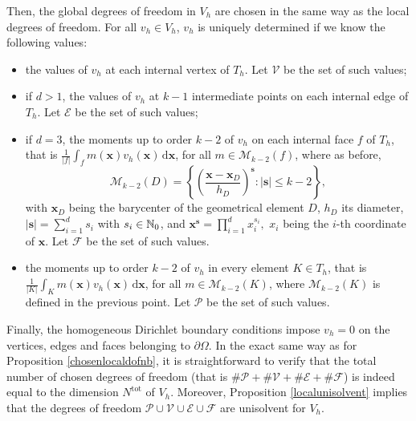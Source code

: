 Then, the global degrees of freedom in $V_h$ are chosen in the same way as the local degrees of freedom. For all $v_h\in V_h$, $v_h$ is uniquely determined if we know the following values:
\begin{itemize}
\item the values of $v_h$ at each internal vertex of $T_h$. Let $\mathcal{V}$ be the set of such values;
\item if $d>1$, the values of $v_h$ at $k-1$ intermediate points on each internal edge of $T_h$. Let $\mathcal{E}$ be the set of such values;
\item if $d=3$, the moments up to order $k-2$ of $v_h$ on each internal face $f$ of $T_h$, that is $\frac{1}{|f|}\int_{f}m(\mathbf{x})v_h(\mathbf{x})\, \mathrm{d}\mathbf{x}$, for all $m\in \mathcal{M}_{k-2}(f)$, where as before, $$\mathcal{M}_{k-2}(D) = \left\{\left(\frac{\mathbf{x}-\mathbf{x}_D}{h_D}\right)^\mathbf{s} : |\mathbf{s}|\leq k-2\right\},$$ with $\mathbf{x}_D$ being the barycenter of the geometrical element $D$, $h_D$ its diameter, $|\mathbf{s}| = \sum_{i=1}^d s_i$ with $s_i\in \mathbb{N}_0$, and $\mathbf{x}^\mathbf{s}=\prod_{i=1}^d x_i^{s_i},$ $x_i$ being the $i$-th coordinate of $\mathbf{x}$. Let $\mathcal{F}$ be the set of such values.
\item the moments up to order $k-2$ of $v_h$ in every element $K\in T_h$, that is $\frac{1}{|K|}\int_Km(\mathbf{x})v_h(\mathbf{x})\, \mathrm{d}\mathbf{x}$, for all $m\in \mathcal{M}_{k-2}(K)$, where $\mathcal{M}_{k-2}(K)$ is defined in the previous point. Let $\mathcal{P}$ be the set of such values.
\end{itemize}
Finally, the homogeneous Dirichlet boundary conditions impose $v_h=0$ on the vertices, edges and faces belonging to $\partial \Omega$. In the exact same way as for Proposition \ref{chosenlocaldofnb}, it is straightforward to verify that the total number of chosen degrees of freedom (that is $\#\mathcal{P}+\#\mathcal{V}+\#\mathcal{E}+\#\mathcal{F}$) is indeed equal to the dimension $N^\text{tot}$ of $V_h$. Moreover, Proposition \ref{localunisolvent} implies that the degrees of freedom $\mathcal{P}\cup\mathcal{V}\cup\mathcal{E}\cup\mathcal{F}$ are unisolvent for $V_h$. \\

